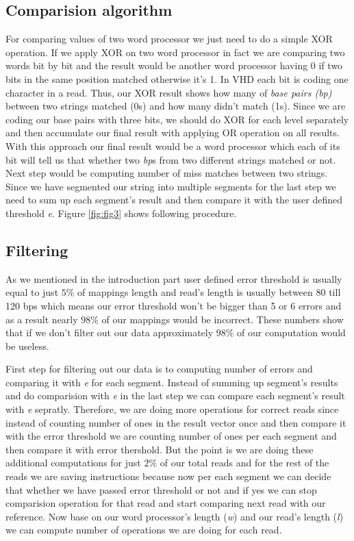 \subsection{Comparision algorithm}
For comparing values of two word processor we just need to do a simple XOR operation. If we apply XOR on two word processor in fact we are comparing two words bit by bit and the result would be another word processor having 0 if two bits in the same position matched otherwise it's 1. In VHD each bit is coding one character in a read. Thus, our XOR result shows how many of \emph{base pairs (bp)} between two strings matched (0s) and how many didn't match (1s).
Since we are coding our base pairs with three bits, we should do XOR for each level separately and then accumulate our final result with applying OR operation  on all results. With this approach our final result would be a word processor which each of its bit will tell us that whether two \textit{bp}s from two different strings matched or not. Next step would be computing number of miss matches between two strings. Since we have segmented our string into multiple segments for the last step we need to sum up each segment's result and then compare it with the user defined threshold \textit{e}. Figure \ref{fig:fig3} shows following procedure.
  
\begin{figure}
\end{figure}

\subsection{Filtering}
As we mentioned in the introduction part user defined error threshold is usually equal to just $5\%$ of mappings length and read's length is usually between 80 till 120 bps which means our error threshold won't be bigger than 5 or 6 errors and as a result nearly $98\%$ of our mappings would be incorrect. These numbers show that if we don't filter out our data approximately $98\%$ of our computation would be useless. 

First step for filtering out our data is to computing number of errors and comparing it with \emph{e} for each segment. Instead of summing up segment's results and do comparision with \emph{e} in the last step we can compare each segment's result with \emph{e} sepratly. Therefore, we are doing more operations for correct reads since instead of counting number of ones in the result vector once and then compare it with the error threshold we are counting number of ones per each segment and then compare it with error thershold.  But the point is we are doing these additional computations for just $2\%$ of our total reads and for the rest of the reads we are saving instructions because now per each segment we can decide that whether we have passed error threshold or not and if yes we can stop comparision operation for that read and start comparing next read with our reference. Now base on our word processor's length (\emph{w}) and our read's length (\emph{l}) we can compute number of operations we are doing for each read.

